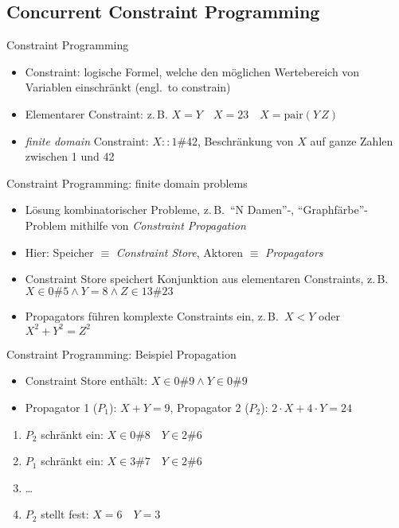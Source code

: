 \subsection{Concurrent Constraint Programming}
\begin{frame}{Constraint Programming}
  \begin{itemize}
    \item Constraint: logische Formel, welche den möglichen Wertebereich von 
    Variablen einschränkt (engl.\ to constrain)
    \item Elementarer Constraint: z.\,B.\: $X=Y \quad X=23 \quad 
    X=\mathrm{pair}(Y\,Z)$
    \item \textsl{finite domain} Constraint: $X::1\#42$, Beschränkung von $X$ 
    auf ganze Zahlen zwischen 1 und 42
  \end{itemize}
\end{frame}

\begin{frame}{Constraint Programming: finite domain problems}
  \begin{itemize}
    \item Lösung kombinatorischer Probleme, z.\,B.\ "`N Damen"'-, 
    "`Graphfärbe"'-Problem mithilfe von \textsl{Constraint Propagation}
    \item Hier: Speicher $\equiv$ \textsl{Constraint Store}, Aktoren $\equiv$ 
    \textsl{Propagators}
    \item Constraint Store speichert Konjunktion aus elementaren Constraints, 
    z.\,B.\ $X \in 0\#5 \wedge Y = 8 \wedge Z \in 13\#23$
    \item Propagators führen komplexte Constraints ein, z.\,B.\ $X < Y$ oder 
    $X^2 + Y^2 = Z^2$
  \end{itemize}
\end{frame}

\begin{frame}{Constraint Programming: Beispiel Propagation}
  \begin{itemize}
    \item Constraint Store enthält: $X \in 0\#9 \wedge Y \in 0\#9$
    \item Propagator 1 ($P_1$): $X + Y = 9$, Propagator 2 ($P_2$): $2 \cdot X + 
    4 \cdot Y = 24$
  \end{itemize}
  \pause
  \begin{enumerate}[<+->]
    \item $P_2$ schränkt ein: $X \in 0\#8 \quad Y \in 2\#6$
    \item $P_1$ schränkt ein: $X \in 3\#7 \quad Y \in 2\#6$
    \item \ldots
    \item $P_2$ stellt fest: $X = 6 \quad Y = 3$
  \end{enumerate}
\end{frame}

